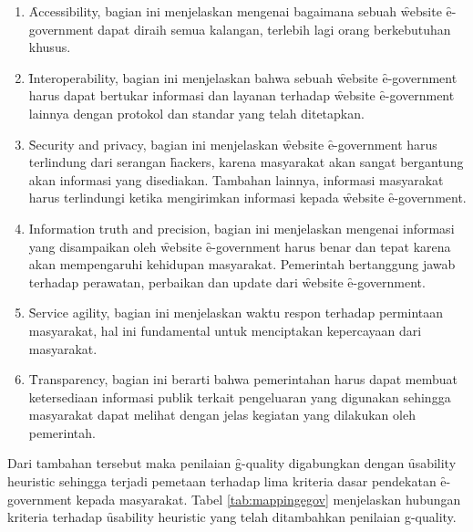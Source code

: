 \begin{enumerate}
	\item \f{Accessibility}, bagian ini menjelaskan mengenai bagaimana sebuah \f{website} \f{e-government} dapat diraih semua kalangan, terlebih lagi orang berkebutuhan khusus.
	\item \f{Interoperability}, bagian ini menjelaskan bahwa sebuah \f{website} \f{e-government} harus dapat bertukar informasi dan layanan terhadap \f{website} \f{e-government} lainnya dengan protokol dan standar yang telah ditetapkan.
	\item \f{Security and privacy}, bagian ini menjelaskan \f{website} \f{e-government} harus terlindung dari serangan \f{hackers}, karena masyarakat akan sangat bergantung akan informasi yang disediakan. Tambahan lainnya, informasi masyarakat harus terlindungi ketika mengirimkan informasi kepada \f{website} \f{e-government}.
	\item Information truth and precision, bagian ini menjelaskan mengenai informasi yang disampaikan oleh \f{website} \f{e-government} harus benar dan tepat karena akan mempengaruhi kehidupan masyarakat. Pemerintah bertanggung jawab terhadap perawatan, perbaikan dan update dari \f{website} \f{e-government}.
	\item \f{Service agility}, bagian ini menjelaskan waktu respon terhadap permintaan masyarakat, hal ini fundamental untuk menciptakan kepercayaan dari masyarakat.
	\item \f{Transparency}, bagian ini berarti bahwa pemerintahan harus dapat membuat ketersediaan informasi publik terkait pengeluaran yang digunakan sehingga masyarakat dapat melihat dengan jelas kegiatan yang dilakukan oleh pemerintah. 
\end{enumerate} 
Dari tambahan tersebut maka penilaian \f{g-quality} digabungkan dengan \f{usability heuristic} sehingga terjadi pemetaan terhadap lima kriteria dasar pendekatan \f{e-government} kepada masyarakat. Tabel \ref{tab:mappingegov} menjelaskan hubungan kriteria terhadap \f{usability heuristic} yang telah ditambahkan penilaian g-quality.
